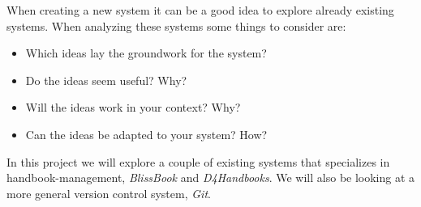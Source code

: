When creating a new system it can be a good idea to explore already existing systems. When analyzing these systems some things to consider are:

\begin{itemize}
  \item Which ideas lay the groundwork for the system?
  \item Do the ideas seem useful? Why?
  \item Will the ideas work in your context? Why?
  \item Can the ideas be adapted to your system? How?
\end{itemize}


In this project we will explore a couple of existing systems that specializes in handbook-management, \textit{BlissBook} and \textit{D4Handbooks}. We will also be looking at a more general version control system, \textit{Git}.
